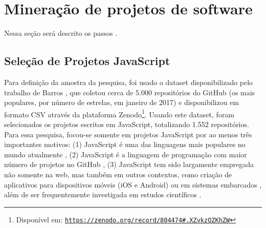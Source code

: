 


\section{Mineração de projetos de software}

Nessa seção será descrito os passos .



\subsection{Seleção de Projetos JavaScript}

Para definição da amostra da pesquisa, foi usado o dataset disponibilizado pelo trabalho de Barros \cite{7816479}, que coletou cerca de 5.000 repositórios do GitHub (os mais populares, por número de estrelas, em janeiro de 2017) e disponibilizou em formato CSV através da plataforma Zenodo\footnote{Disponível em: \texttt{\url{https://zenodo.org/record/804474#.XZvkzOZKhZW}}}. 
Usando este dataset, foram selecionados os projetos escritos em JavaScript, totalizando 1.552 repositórios. Para essa pesquisa, focou-se somente em projetos JavaScript por ao menos três importantes motivos: (1) JavaScript é uma das linguagens mais populares no mundo atualmente \cite{JSpopular}, (2) JavaScript é a linguagem de programação com maior número de projetos no GitHub \cite{JSInGithub}, (3) JavaScript tem sido largamente empregada não somente na web, mas também em outros contextos, como criação de aplicativos para dispositivos móveis (iOS e Android) \cite{JSMobileApps} ou em sistemas embarcados \cite{JSIoT}, além de ser frequentemente investigada em estudos científicos \cite{8595210,8816735}.

